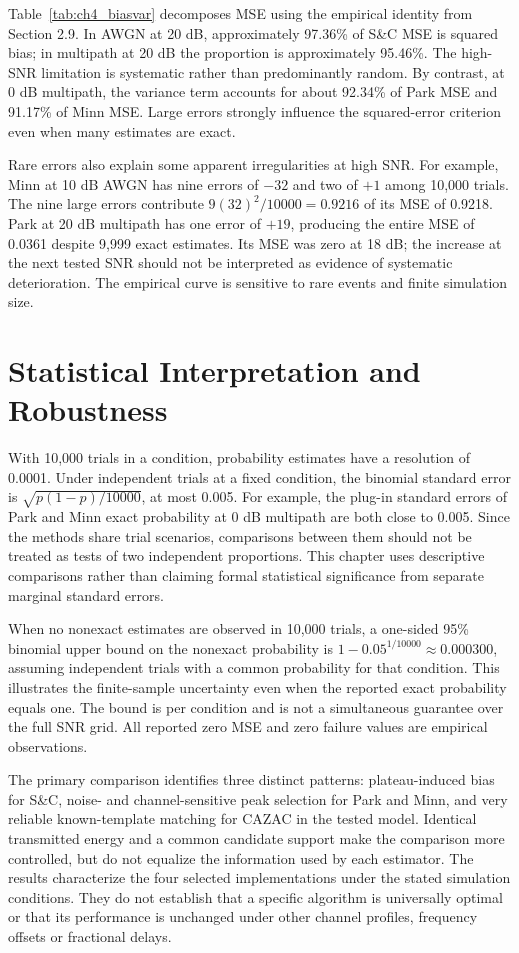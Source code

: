 Table~\ref{tab:ch4_biasvar} decomposes MSE using the empirical identity from Section 2.9. In AWGN at 20 dB, approximately 97.36\% of S\&C MSE is squared bias; in multipath at 20 dB the proportion is approximately 95.46\%. The high-SNR limitation is systematic rather than predominantly random. By contrast, at 0 dB multipath, the variance term accounts for about 92.34\% of Park MSE and 91.17\% of Minn MSE. Large errors strongly influence the squared-error criterion even when many estimates are exact.

Rare errors also explain some apparent irregularities at high SNR. For example, Minn at 10 dB AWGN has nine errors of $-32$ and two of $+1$ among 10,000 trials. The nine large errors contribute $9(32)^2/10000=0.9216$ of its MSE of 0.9218. Park at 20 dB multipath has one error of $+19$, producing the entire MSE of 0.0361 despite 9,999 exact estimates. Its MSE was zero at 18 dB; the increase at the next tested SNR should not be interpreted as evidence of systematic deterioration. The empirical curve is sensitive to rare events and finite simulation size.

\section[Statistical Interpretation]{Statistical Interpretation and Robustness}
\label{sec:ch4_statistical}
With 10,000 trials in a condition, probability estimates have a resolution of 0.0001. Under independent trials at a fixed condition, the binomial standard error is $\sqrt{p(1-p)/10000}$, at most 0.005. For example, the plug-in standard errors of Park and Minn exact probability at 0 dB multipath are both close to 0.005. Since the methods share trial scenarios, comparisons between them should not be treated as tests of two independent proportions. This chapter uses descriptive comparisons rather than claiming formal statistical significance from separate marginal standard errors.

When no nonexact estimates are observed in 10,000 trials, a one-sided 95\% binomial upper bound on the nonexact probability is $1-0.05^{1/10000}\approx 0.000300$, assuming independent trials with a common probability for that condition. This illustrates the finite-sample uncertainty even when the reported exact probability equals one. The bound is per condition and is not a simultaneous guarantee over the full SNR grid. All reported zero MSE and zero failure values are empirical observations.

The primary comparison identifies three distinct patterns: plateau-induced bias for S\&C, noise- and channel-sensitive peak selection for Park and Minn, and very reliable known-template matching for CAZAC in the tested model. Identical transmitted energy and a common candidate support make the comparison more controlled, but do not equalize the information used by each estimator. The results characterize the four selected implementations under the stated simulation conditions. They do not establish that a specific algorithm is universally optimal or that its performance is unchanged under other channel profiles, frequency offsets or fractional delays.

